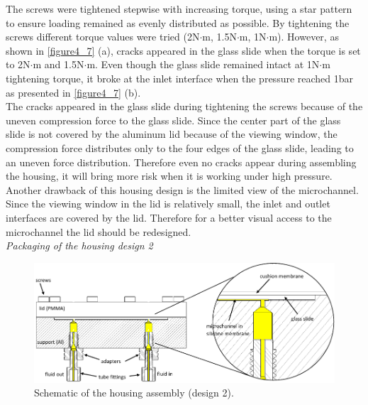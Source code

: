 The screws were tightened stepwise with increasing torque, using a star pattern to ensure loading remained as evenly distributed as possible. By tightening the screws different torque values were tried (2N$\cdot$m, 1.5N$\cdot$m, 1N$\cdot$m). However, as shown in \autoref{figure4_7} (a), cracks appeared in the glass slide when the torque is set to 2N$\cdot$m and 1.5N$\cdot$m. Even though the glass slide remained intact at 1N$\cdot$m tightening torque, it broke at the inlet interface when the pressure reached 1bar as presented in \autoref{figure4_7} (b). \\

The cracks appeared in the glass slide during tightening the screws because of the uneven compression force to the glass slide. Since the center part of the glass slide is not covered by the aluminum lid because of the viewing window, the compression force distributes only to the four edges of the glass slide, leading to an uneven force distribution. Therefore even no cracks appear during assembling the housing, it will bring more risk when it is working under high pressure.\\

Another drawback of this housing design is the limited view of the microchannel. Since the viewing window in the lid is relatively small, the inlet and outlet interfaces are covered by the lid. Therefore for a better visual access to the microchannel the lid should be redesigned.\\

\noindent \textit{Packaging of the housing design 2}\\

\begin{figure}[!b]%
\centering
\includegraphics[width=1\textwidth]{figures/packagingandtestunderhighpressure/figure4_8}%
\caption{Schematic of the housing assembly (design 2).}%
\label{figure4_8}%
\end{figure}

